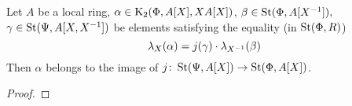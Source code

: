 \begin{lemma} \label{lem:horrocks--ingredient}
Let $A$ be a local ring, $\alpha \in \operatorname{K}_2(\Phi, A[X], XA[X])$, $\beta \in \operatorname{St}(\Phi, A[X^{-1}]),$ $\gamma \in \operatorname{St}(\Psi, A[X, X^{-1}])$ be elements satisfying the equality (in $\operatorname{St}(\Phi, R)$)
\begin{equation} \label{eq:alpha-def}\lambda_X(\alpha) = j(\gamma) \cdot \lambda_{X^{-1}}(\beta) \end{equation}
Then $\alpha$ belongs to the image of $j\colon \operatorname{St}(\Psi, A[X]) \to \operatorname{St}(\Phi, A[X])$.
\end{lemma}
\begin{proof}
\end{proof}

\begin{comment}
\begin{proof}
    Denote by $M$ the maximal ideal of $A$ and by $k$ its residue field.
    We denote by $\pi_A$ (resp. $\pi_{A[X]}$, resp. $\pi_{R}$) the canonical homomorphism $A \to k$ (resp. $A[X] \to k[X]$, resp. $R \to k[X, X\inv]$).

    Since $\K_2(\Psi, k[X])$ surjects onto $\K_2(\Phi, k[X])$ there exists $\alpha_0 \in \St(\Psi, A[X])$ such that $j(\alpha_0) \cdot \alpha \in \overline{\St}(\Phi, A[X], M[X])$ and
    hence $\pi_{A[X]}^*(j(\alpha_0) \cdot \alpha) = 1$.
    By definition of relative Steinberg groups, there exists $\widetilde{\alpha} \in \St(\Phi, A[X], M[X])$ such that
    $\iota \cdot \lambda_X^{rel}(\widetilde{\alpha}) = \lambda_X^* (j(\alpha_0) \cdot \alpha)$. %

    Now consider the element $\pi^*_{A[X\inv]}(\beta) \in \St(\Phi, k[X\inv])$.
    Its image in $\G(\Phi, k[X\inv])$ is contained in the subgroup $\G(\Psi, k[X\inv])$.
    Since $\K_1(\Psi, k[X\inv]) = 1$, there exist
    \[\beta_0 \in \St(\Psi, A[X\inv]),\ \beta_1 \in \St(\Phi, A[X\inv], M[X\inv])\] such that $\beta = j(\beta_0) \cdot \beta_1$.
    Set $\gamma_1 \coloneqq \lambda^*_X(\alpha_0) \cdot \gamma \cdot \lambda^*_{X\inv}(\beta_0) \in \St(\Psi, R)$.
    It follows from~\eqref{eq:alpha-def} that the element $\pi_R^*(j(\gamma_1)) \in \St(\Phi, k[X, X\inv])$ is trivial, hence $\pi^*_R(\gamma_1) \in \K_2(\Psi, k[X, X\inv])$.
    Recall from~\cite{Hur77} that $\K_2(\Psi, k[X, X\inv]) \to \K_2(\Phi, k[X, X\inv])$ is injective (see the assertion after Korollar~6).
    Thus, $\gamma_1 \in \overline{\St}(\Psi, R, M[X, X\inv]).$
    There exists $\gamma_2 \in \St(\Psi, R, M[X, X\inv])$ such that $\iota (\gamma_2) = \gamma_1$.
    Notice that $j(\gamma_2) \cdot \lambda_{X\inv}^{rel}(\beta_1) = \kappa \lambda_X^{rel}(\widetilde{\alpha})$ for $\kappa \in \Ker(\iota\colon \St(\Phi, R, M[X, X\inv]) \to \St(\Phi, R))$


\end{comment}
